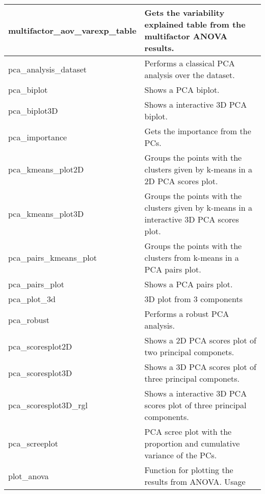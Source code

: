 \begin{scriptsize}
\begin{longtable}{|m{4.3cm}|m{11cm}|}
		\hline
		multifactor\_aov\_varexp\_table & Gets the variability explained table from the multifactor ANOVA results. \\
		
		\hline
		pca\_analysis\_dataset & Performs a classical PCA analysis over the dataset. \\
		
		\hline
		pca\_biplot & Shows a PCA biplot. \\
		
		\hline
		pca\_biplot3D & Shows a interactive 3D PCA biplot. \\
		
		\hline 
		pca\_importance & Gets the importance from the PCs. \\
		
		\hline
		pca\_kmeans\_plot2D & Groups the points with the clusters given by k-means in a 2D PCA scores plot. \\
		
		\hline
		pca\_kmeans\_plot3D & Groups the points with the clusters given by k-means in a interactive 3D PCA scores plot. \\
		
		\hline
		pca\_pairs\_kmeans\_plot & Groups the points with the clusters from k-means in a PCA pairs plot. \\
		
		\hline
		pca\_pairs\_plot & Shows a PCA pairs plot. \\
		
		\hline
		pca\_plot\_3d & 3D plot from 3 components \\
		
		\hline
		pca\_robust & Performs a robust PCA analysis. \\
		
		\hline
		pca\_scoresplot2D & Shows a 2D PCA scores plot of two principal componets. \\
		
		\hline
		pca\_scoresplot3D & Shows a 3D PCA scores plot of three principal componets. \\
		
		\hline
		pca\_scoresplot3D\_rgl & Shows a interactive 3D PCA scores plot of three principal components. \\
		
		\hline
		pca\_screeplot & PCA scree plot with the proportion and cumulative variance of the PCs. \\
		
		\hline
		plot\_anova & Function for plotting the results from ANOVA.
		Usage \\
		

\end{longtable}
\end{scriptsize}
